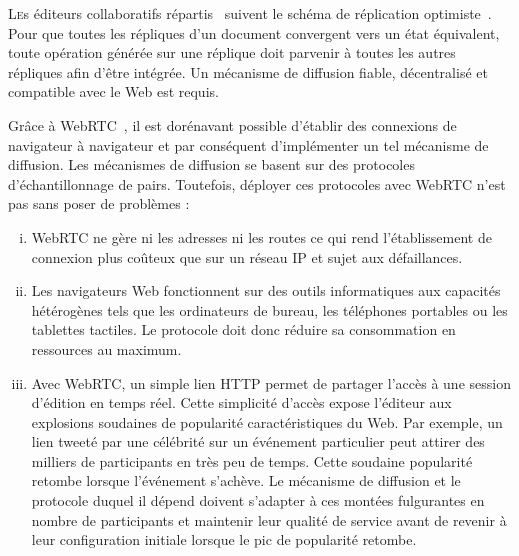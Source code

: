 

\lettrine{L}es éditeurs collaboratifs répartis~\cite{ellis1991groupware} suivent
le schéma de réplication optimiste~\cite{demers1987epidemic,
  johnson1975maintenance, ladin1992providing, saito2005optimistic}. Pour que
toutes les répliques d'un document convergent vers un état équivalent, toute
opération générée sur une réplique doit parvenir à toutes les autres répliques
afin d'être intégrée. Un mécanisme de diffusion fiable, décentralisé et
compatible avec le Web est requis.

Grâce à WebRTC~\cite{webrtc}, il est dorénavant possible d'établir des
connexions de navigateur à navigateur et par conséquent d'implémenter un tel
mécanisme de diffusion.
Les mécanismes de diffusion se basent sur des protocoles d'échantillonnage de
pairs. Toutefois, déployer ces protocoles avec WebRTC n'est pas sans poser de
problèmes :
\begin{enumerate}[(i)]
\item WebRTC ne gère ni les adresses ni les routes ce qui rend l'établissement
  de connexion plus coûteux que sur un réseau IP et sujet aux défaillances.
\item Les navigateurs Web fonctionnent sur des outils informatiques aux
  capacités hétérogènes tels que les ordinateurs de bureau, les téléphones
  portables ou les tablettes tactiles. Le protocole doit donc réduire sa
  consommation en ressources au maximum.
\item Avec WebRTC, un simple lien HTTP %
  permet de partager l'accès à une session d'édition en temps réel. Cette
  simplicité d'accès expose l'éditeur aux explosions soudaines de popularité
  caractéristiques du Web.  Par exemple, un lien \og tweeté \fg par une
  célébrité sur un événement particulier peut attirer des milliers de
  participants en très peu de temps. Cette soudaine popularité retombe lorsque
  l'événement s'achève.  Le mécanisme de diffusion et le protocole duquel il
  dépend doivent s'adapter à ces montées fulgurantes en nombre de participants et
  maintenir leur qualité de service avant de revenir à leur configuration
  initiale lorsque le pic de popularité retombe.
\end{enumerate}


